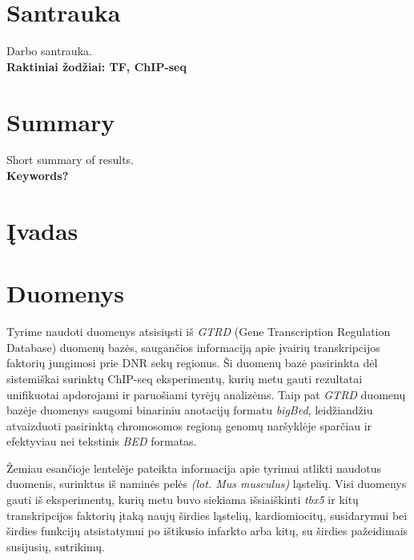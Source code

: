 \documentclass[11pt]{article}
\begin{document}
\section*{Santrauka}
Darbo santrauka.\\

\textbf{Raktiniai žodžiai: TF, ChIP-seq}
\newpage

\section*{Summary}
Short summary of results.\\

\textbf{Keywords?}
\newpage

\section{Įvadas}
\newpage

\section{Duomenys}

Tyrime naudoti duomenys atsisiųsti iš \emph{GTRD} (Gene Transcription
Regulation Database) duomenų bazės, saugančios informaciją apie įvairių
transkripcijos faktorių jungimosi prie DNR sekų regionus. Ši duomenų
bazė pasirinkta dėl sistemiškai surinktų ChIP-seq eksperimentų, kurių
metu gauti rezultatai unifikuotai apdorojami ir paruošiami tyrėjų
analizėms. Taip pat \emph{GTRD} duomenų bazėje duomenys saugomi
binariniu anotacijų formatu \emph{bigBed}, leidžiandžiu atvaizduoti
pasirinktą chromosomos regioną genomų naršyklėje sparčiau ir 
efektyviau nei tekstinis \emph{BED} formatas.

Žemiau esančioje lentelėje pateikta informacija apie tyrimui atlikti
naudotus duomenis, surinktus iš naminės pelės \emph{(lot. Mus musculus)}
ląstelių. Visi duomenys gauti iš eksperimentų, kurių metu buvo
siekiama išsiaiškinti \emph{tbx5} ir kitų transkripcijos faktorių
įtaką naujų širdies ląstelių, kardiomiocitų, susidarymui bei širdies
funkcijų atsistatymui po ištikusio infarkto arba kitų, su širdies
pažeidimais susijusių, sutrikimų.
\end{document}
